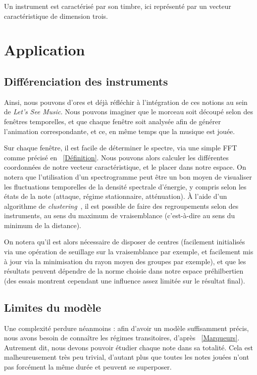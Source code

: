 \documentclass[10pt]{article}
\begin{document}
\begin{multicols}{2}
Un instrument est caractérisé par son timbre, ici représenté par un vecteur caractéristique de dimension trois.





\label{Application}
\section{Application}



\label{Différenciation}
\subsection{Différenciation des instruments}

Ainsi, nous pouvons d'ores et déjà réfléchir à l'intégration de ces notions au sein de \emph{Let's See Music}.
Nous pouvons imaginer que le morceau soit découpé selon des fenêtres temporelles, et que chaque fenêtre soit analysée afin de générer l'animation correspondante, et ce, en même temps que la musique est jouée.

Sur chaque fenêtre, il est facile de déterminer le spectre, via une simple FFT comme précisé en ~\ref{Définition}.
Nous pouvons alors calculer les différentes coordonnées de notre vecteur caractéristique, et le placer dans notre espace.
On notera que l'utilisation d'un spectrogramme peut être un bon moyen de visualiser les fluctuations temporelles de la densité spectrale d'énergie, y compris selon les états de la note (attaque, régime stationnaire, atténuation).
À l'aide d'un algorithme de \emph{clustering}~\cite{Clustering}, il est possible de faire des regroupements selon des instruments, au sens du maxi\-mum de vraisemblance (c'est-à-dire au sens du minimum de la distance).

On notera qu'il est alors nécessaire de disposer de centres (facilement initialisés via une opération de seuillage sur la vraisemblance par exemple, et facilement mis à jour via la minimisation du rayon moyen des groupes par exemple), et que les résultats peuvent dépendre de la norme choisie dans notre espace préhilbertien (des essais montrent cependant une influence assez limitée sur le résultat final).


\label{Limites}
\subsection{Limites du modèle}

Une complexité perdure néanmoins : afin d'avoir un mo\-dèle suffisamment précis, nous avons besoin de connaître les régimes transitoires, d'après ~\ref{Marqueurs}.
Autrement dit, nous devons pouvoir étudier chaque note dans sa totalité.
Cela est malheureusement très peu trivial, d'autant plus que toutes les notes jouées n'ont pas forcément la même durée et peuvent se superposer.


\end{multicols}
\end{document}
